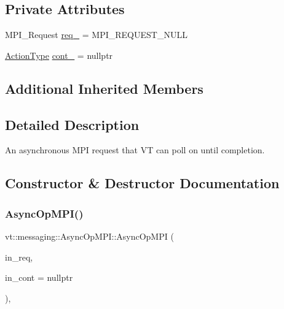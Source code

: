 \subsection*{Private Attributes}
\begin{DoxyCompactItemize}
\item 
M\+P\+I\+\_\+\+Request \hyperlink{structvt_1_1messaging_1_1_async_op_m_p_i_a80403a1d49de934acf1e8b2e3dd6484c}{req\+\_\+} = M\+P\+I\+\_\+\+R\+E\+Q\+U\+E\+S\+T\+\_\+\+N\+U\+LL
\item 
\hyperlink{namespacevt_ae0a5a7b18cc99d7b732cb4d44f46b0f3}{Action\+Type} \hyperlink{structvt_1_1messaging_1_1_async_op_m_p_i_ac3017bb9d51398e04fdbcf2286956a26}{cont\+\_\+} = nullptr
\end{DoxyCompactItemize}
\subsection*{Additional Inherited Members}


\subsection{Detailed Description}
An asynchronous M\+PI request that VT can poll on until completion. 

\subsection{Constructor \& Destructor Documentation}
\mbox{\label{structvt_1_1messaging_1_1_async_op_m_p_i_ac4378764f3662f86a5ef4fe3822a9e47}} 
\subsubsection{\texorpdfstring{Async\+Op\+M\+P\+I()}{AsyncOpMPI()}}
{\footnotesize\ttfamily vt\+::messaging\+::\+Async\+Op\+M\+P\+I\+::\+Async\+Op\+M\+PI (\begin{DoxyParamCaption}\item[{M\+P\+I\+\_\+\+Request}]{in\+\_\+req,  }\item[{\hyperlink{namespacevt_ae0a5a7b18cc99d7b732cb4d44f46b0f3}{Action\+Type}}]{in\+\_\+cont = {\ttfamily nullptr} }\end{DoxyParamCaption})\hspace{0.3cm}{\ttfamily [inline]}, {\ttfamily [explicit]}}



